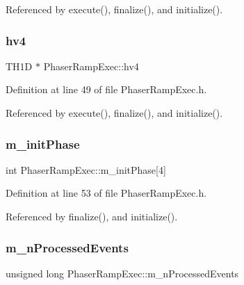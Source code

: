 Referenced by execute(), finalize(), and initialize().

\mbox{\label{classPhaserRampExec_a998b7e5a8d186df60c2d60cba2b43aa0}} 
\subsubsection{\texorpdfstring{hv4}{hv4}}
{\footnotesize\ttfamily T\+H1D $\ast$ Phaser\+Ramp\+Exec\+::hv4\hspace{0.3cm}{\ttfamily [private]}}



Definition at line 49 of file Phaser\+Ramp\+Exec.\+h.



Referenced by execute(), finalize(), and initialize().

\mbox{\label{classPhaserRampExec_a7526a42abb33e880d60570386fd23e3e}} 
\subsubsection{\texorpdfstring{m\+\_\+init\+Phase}{m\_initPhase}}
{\footnotesize\ttfamily int Phaser\+Ramp\+Exec\+::m\+\_\+init\+Phase\mbox{[}4\mbox{]}\hspace{0.3cm}{\ttfamily [private]}}



Definition at line 53 of file Phaser\+Ramp\+Exec.\+h.



Referenced by finalize(), and initialize().

\mbox{\label{classPhaserRampExec_a198ba1ebb9a1b0fb2c599405307e92af}} 
\subsubsection{\texorpdfstring{m\+\_\+n\+Processed\+Events}{m\_nProcessedEvents}}
{\footnotesize\ttfamily unsigned long Phaser\+Ramp\+Exec\+::m\+\_\+n\+Processed\+Events\hspace{0.3cm}{\ttfamily [private]}}



